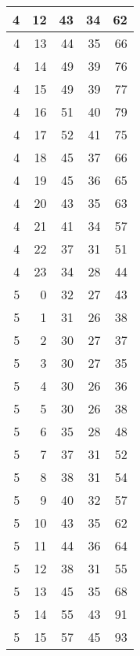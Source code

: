 \begin{longtable}{|r|r|r|r|r|}
    \hline
    4     & 12    & 43    & 34    & 62 \\
    \hline
    4     & 13    & 44    & 35    & 66 \\
    \hline
    4     & 14    & 49    & 39    & 76 \\
    \hline
    4     & 15    & 49    & 39    & 77 \\
    \hline
    4     & 16    & 51    & 40    & 79 \\
    \hline
    4     & 17    & 52    & 41    & 75 \\
    \hline
    4     & 18    & 45    & 37    & 66 \\
    \hline
    4     & 19    & 45    & 36    & 65 \\
    \hline
    4     & 20    & 43    & 35    & 63 \\
    \hline
    4     & 21    & 41    & 34    & 57 \\
    \hline
    4     & 22    & 37    & 31    & 51 \\
    \hline
    4     & 23    & 34    & 28    & 44 \\
    \hline
    5     & 0     & 32    & 27    & 43 \\
    \hline
    5     & 1     & 31    & 26    & 38 \\
    \hline
    5     & 2     & 30    & 27    & 37 \\
    \hline
    5     & 3     & 30    & 27    & 35 \\
    \hline
    5     & 4     & 30    & 26    & 36 \\
    \hline
    5     & 5     & 30    & 26    & 38 \\
    \hline
    5     & 6     & 35    & 28    & 48 \\
    \hline
    5     & 7     & 37    & 31    & 52 \\
    \hline
    5     & 8     & 38    & 31    & 54 \\
    \hline
    5     & 9     & 40    & 32    & 57 \\
    \hline
    5     & 10    & 43    & 35    & 62 \\
    \hline
    5     & 11    & 44    & 36    & 64 \\
    \hline
    5     & 12    & 38    & 31    & 55 \\
    \hline
    5     & 13    & 45    & 35    & 68 \\
    \hline
    5     & 14    & 55    & 43    & 91 \\
    \hline
    5     & 15    & 57    & 45    & 93 \\

\end{longtable}
